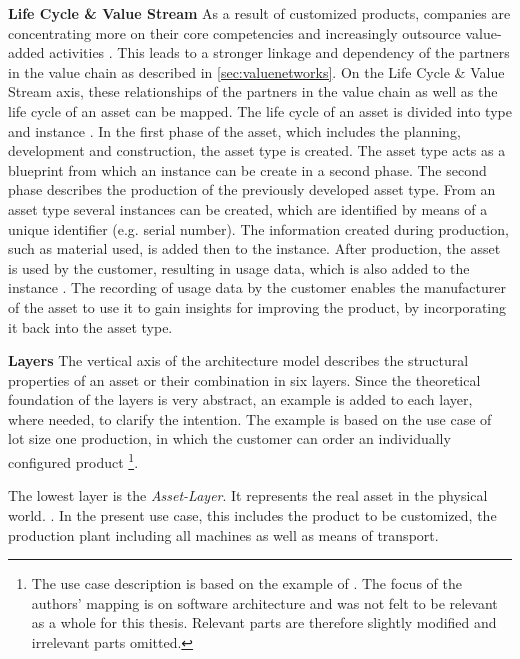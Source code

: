 \textbf{Life Cycle \& Value Stream} As a result of customized products, companies are concentrating more on their core competencies and increasingly outsource value-added activities \cite[p. 11]{Arnold2018DigitaleMittelstand}. This leads to a stronger linkage and dependency of the partners in the value chain as described in \ref{sec:valuenetworks}. On the Life Cycle \& Value Stream axis, these relationships of the partners in the value chain as well as the life cycle of an asset can be mapped. The life cycle of an asset is divided into type and instance \cite[p. 43]{Heidel2017ReferenzarchitekturmodellIndustrie4.0Komponente}. In the first phase of the asset, which includes the planning, development and construction, the asset type is created. The asset type acts as a blueprint from which an instance can be create in a second phase. The second phase describes the production of the previously developed asset type. From an asset type several instances can be created, which are identified by means of a unique identifier (e.g. serial number). The information created during production, such as material used, is added then to the instance. After production, the asset is used by the customer, resulting in usage data, which is also added to the instance \cite[p. 43]{Heidel2017ReferenzarchitekturmodellIndustrie4.0Komponente}. The recording of usage data by the customer enables the manufacturer of the asset to use it to gain insights for improving the product, by incorporating it back into the asset type.
    
\textbf{Layers} The vertical axis of the architecture model describes the structural properties of an asset or their combination in six layers. Since the theoretical foundation of the layers is very abstract, an example is added to each layer, where needed, to clarify the intention. The example is based on the use case of lot size one production, in which the customer can order an individually configured product \footnote{The use case description is based on the example of \citet[p. 39 - 41]{Anderl2016Softwarearchitekturen4.0}. The focus of the authors' mapping is on software architecture and was not felt to be relevant as a whole for this thesis. Relevant parts are therefore slightly modified and irrelevant parts omitted.}. 
    
The lowest layer is the \textit{Asset-Layer}. It represents the real asset in the physical world. \cite[p. 46]{Heidel2017ReferenzarchitekturmodellIndustrie4.0Komponente}. In the present use case, this includes the product to be customized, the production plant including all machines as well as means of transport. 
    
